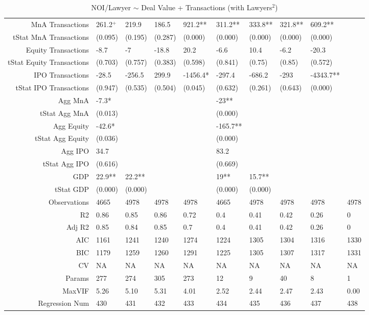 \begin{table}[ht]
\begin{tabular}{rlllllllll}
  MnA Transactions & 261.2$^{+}$ & 219.9 & 186.5 & 921.2** & 311.2** & 333.8** & 321.8** & 609.2** &  \\ 
  tStat MnA Transactions & (0.095) & (0.195) & (0.287) & (0.000) & (0.000) & (0.000) & (0.000) & (0.000) &  \\ 
  Equity Transactions & -8.7 & -7 & -18.8 & 20.2 & -6.6 & 10.4 & -6.2 & -20.3 &  \\ 
  tStat Equity Transactions & (0.703) & (0.757) & (0.383) & (0.598) & (0.841) & (0.75) & (0.85) & (0.572) &  \\ 
  IPO Transactions & -28.5 & -256.5 & 299.9 & -1456.4* & -297.4 & -686.2 & -293 & -4343.7** &  \\ 
  tStat IPO Transactions & (0.947) & (0.535) & (0.504) & (0.045) & (0.632) & (0.261) & (0.643) & (0.000) &  \\ 
  Agg MnA & -7.3* &  &  &  & -23** &  &  &  &  \\ 
  tStat Agg MnA & (0.013) &  &  &  & (0.000) &  &  &  &  \\ 
  Agg Equity & -42.6* &  &  &  & -165.7** &  &  &  &  \\ 
  tStat Agg Equity & (0.036) &  &  &  & (0.000) &  &  &  &  \\ 
  Agg IPO & 34.7 &  &  &  & 83.2 &  &  &  &  \\ 
  tStat Agg IPO & (0.616) &  &  &  & (0.669) &  &  &  &  \\ 
  GDP & 22.9** & 22.2** &  &  & 19** & 15.7** &  &  &  \\ 
  tStat GDP & (0.000) & (0.000) &  &  & (0.000) & (0.000) &  &  &  \\ 
  Observations & 4665 & 4978 & 4978 & 4978 & 4665 & 4978 & 4978 & 4978 & 4978 \\ 
  R2 & 0.86 & 0.85 & 0.86 & 0.72 & 0.4 & 0.41 & 0.42 & 0.26 & 0 \\ 
  Adj R2 & 0.85 & 0.84 & 0.85 & 0.7 & 0.4 & 0.41 & 0.42 & 0.26 & 0 \\ 
  AIC & 1161 & 1241 & 1240 & 1274 & 1224 & 1305 & 1304 & 1316 & 1330 \\ 
  BIC & 1179 & 1259 & 1260 & 1291 & 1225 & 1305 & 1307 & 1317 & 1331 \\ 
  CV & NA & NA & NA & NA & NA & NA & NA & NA & NA \\ 
  Params & 277 & 274 & 305 & 273 & 12 & 9 & 40 & 8 & 1 \\ 
  MaxVIF & 5.26 & 5.10 & 5.31 & 4.01 & 2.52 & 2.44 & 2.47 & 2.43 & 0.00 \\ 
  Regression Num & 430 & 431 & 432 & 433 & 434 & 435 & 436 & 437 & 438 \\ 
   \hline
\end{tabular}
\caption{NOI/Lawyer $\sim$ Deal Value + Transactions (with Lawyers$^2$)} 
\end{table}
